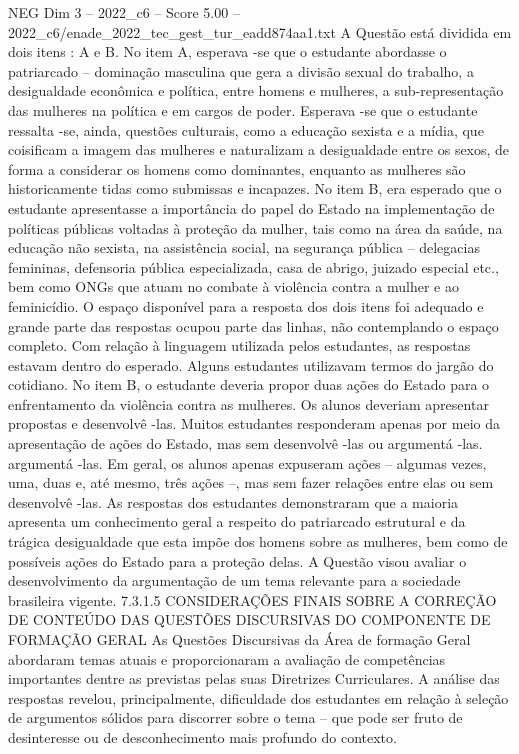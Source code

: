 \begin{textsample}{NEG Dim 3 – 2022\_c6 – Score 5.00 – 2022\_c6/enade\_2022\_tec\_gest\_tur\_eadd874aa1.txt}
A Questão está dividida em dois itens : A e B.
No item A, esperava -se que o estudante abordasse o patriarcado – dominação masculina que gera a divisão sexual do trabalho, a desigualdade econômica e política, entre homens e mulheres, a sub-representação das mulheres na política e em cargos de poder.
Esperava -se que o estudante ressalta -se, ainda, questões culturais, como a educação sexista e a mídia, que coisificam a imagem das mulheres e naturalizam a desigualdade entre os sexos, de forma a considerar os homens como dominantes, enquanto as mulheres são historicamente tidas como submissas e incapazes.
No item B, era esperado que o estudante apresentasse a importância do papel do Estado na implementação de políticas públicas voltadas à proteção da mulher, tais como na área da saúde, na educação não sexista, na assistência social, na segurança pública – delegacias femininas, defensoria pública especializada, casa de abrigo, juizado especial etc., bem como ONGs que atuam no combate à violência contra a mulher e ao feminicídio.
O espaço disponível para a resposta dos dois itens foi adequado e grande parte das respostas ocupou parte das linhas, não contemplando o espaço completo.
Com relação à linguagem utilizada pelos estudantes, as respostas estavam dentro do esperado.
Alguns estudantes utilizavam termos do jargão do cotidiano.
No item B, o estudante deveria propor duas ações do Estado para o enfrentamento da violência contra as mulheres.
Os alunos deveriam apresentar propostas e desenvolvê -las.
Muitos estudantes responderam apenas por meio da apresentação de ações do Estado, mas sem desenvolvê -las ou argumentá -las. argumentá -las.
Em geral, os alunos apenas expuseram ações – algumas vezes, uma, duas e, até mesmo, três ações –, mas sem fazer relações entre elas ou sem desenvolvê -las.
As respostas dos estudantes demonstraram que a maioria apresenta um conhecimento geral a respeito do patriarcado estrutural e da trágica desigualdade que esta impõe dos homens sobre as mulheres, bem como de possíveis ações do Estado para a proteção delas.
A Questão visou avaliar o desenvolvimento da argumentação de um tema relevante para a sociedade brasileira vigente. 7.3.1.5 CONSIDERAÇÕES FINAIS SOBRE A CORREÇÃO DE CONTEÚDO DAS QUESTÕES DISCURSIVAS DO COMPONENTE DE FORMAÇÃO GERAL As Questões Discursivas da Área de formação Geral abordaram temas atuais e proporcionaram a avaliação de competências importantes dentre as previstas pelas suas Diretrizes Curriculares.
A análise das respostas revelou, principalmente, dificuldade dos estudantes em relação à seleção de argumentos sólidos para discorrer sobre o tema – que pode ser fruto de desinteresse ou de desconhecimento mais profundo do contexto.

\end{textsample}
